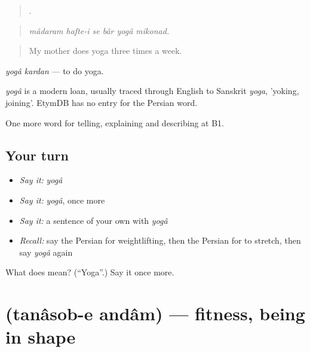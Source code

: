 \begin{quote}
      .
\end{quote}

\begin{quote}
\emph{mâdaram hafte-i se bâr yogâ mikonad.}
\end{quote}

\begin{quote}
My mother does yoga three times a week.
\end{quote}

\emph{yogâ kardan} — to do yoga.

\begin{cousinweb}
\emph{yogâ} is a modern loan, usually traced through English to Sanskrit \emph{yoga}, 'yoking, joining'. EtymDB has no entry for the Persian word.
\end{cousinweb}

\begin{grammarlens}[title={What you've built}]
One more word for telling, explaining and describing at B1.
\end{grammarlens}

\subsection*{Your turn}
\begin{itemize}
\raggedright
  \item \emph{Say it:} \emph{yogâ}
  \item \emph{Say it:} \emph{yogâ}, once more
  \item \emph{Say it:} a sentence of your own with \emph{yogâ}
  \item \emph{Recall:} say the Persian for weightlifting, then the Persian for to stretch, then say \emph{yogâ} again
\end{itemize}

\begin{tcolorbox}[breakable,colback=teal!4,colframe=teal!35!black,title={Before you move on}]
What does  mean? (\textquotedblleft{}Yoga\textquotedblright{}.) Say it once more.
\end{tcolorbox}
\section[\texorpdfstring{\fa{تناسب} \fa{اندام} (tanâsob-e andâm)}{تناسب اندام (tanâsob-e andâm)}]{  (tanâsob-e andâm) — fitness, being in shape}

